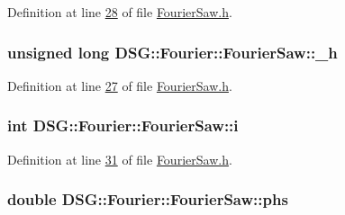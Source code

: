 Definition at line \hyperlink{_fourier_saw_8h_source_l00028}{28} of file \hyperlink{_fourier_saw_8h_source}{Fourier\+Saw.\+h}.

\hypertarget{class_d_s_g_1_1_fourier_1_1_fourier_saw_a78d30240b7eb99fcb249b5aafe3d55b2}{
\subsubsection[{\+\_\+h}]{\setlength{\rightskip}{0pt plus 5cm}unsigned long D\+S\+G\+::\+Fourier\+::\+Fourier\+Saw\+::\+\_\+h\hspace{0.3cm}{\ttfamily [protected]}}}\label{class_d_s_g_1_1_fourier_1_1_fourier_saw_a78d30240b7eb99fcb249b5aafe3d55b2}


Definition at line \hyperlink{_fourier_saw_8h_source_l00027}{27} of file \hyperlink{_fourier_saw_8h_source}{Fourier\+Saw.\+h}.

\hypertarget{class_d_s_g_1_1_fourier_1_1_fourier_saw_a261b19d0082558b6e1bb128d267c400d}{
\subsubsection[{i}]{\setlength{\rightskip}{0pt plus 5cm}int D\+S\+G\+::\+Fourier\+::\+Fourier\+Saw\+::i\hspace{0.3cm}{\ttfamily [protected]}}}\label{class_d_s_g_1_1_fourier_1_1_fourier_saw_a261b19d0082558b6e1bb128d267c400d}


Definition at line \hyperlink{_fourier_saw_8h_source_l00031}{31} of file \hyperlink{_fourier_saw_8h_source}{Fourier\+Saw.\+h}.

\hypertarget{class_d_s_g_1_1_fourier_1_1_fourier_saw_a5df3e5b00224924e106ffdc1d0b6a3cc}{
\subsubsection[{phs}]{\setlength{\rightskip}{0pt plus 5cm}double D\+S\+G\+::\+Fourier\+::\+Fourier\+Saw\+::phs\hspace{0.3cm}{\ttfamily [protected]}}}\label{class_d_s_g_1_1_fourier_1_1_fourier_saw_a5df3e5b00224924e106ffdc1d0b6a3cc}


